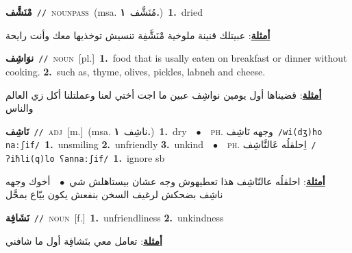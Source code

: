 \documentclass[10pt,a4paper,twoside]{article} %
\begin{document}
\begin{multicols}{2}
{\setlength\topsep{0pt}\textbf{\foreignlanguage{arabic}{مْنَشَّف}}\ {\color{gray}\texttt{//}\color{black}}\ \textsc{noun\textunderscore pass}\ \color{gray}(msa. \foreignlanguage{arabic}{مُنَشَّف}~\foreignlanguage{arabic}{\textbf{١.}})\color{black}\ \textbf{1.}~dried\  \begin{flushright}\color{gray}\foreignlanguage{arabic}{\textbf{\underline{\foreignlanguage{arabic}{أمثلة}}}: عبيتلك قنينة ملوخية مْنَشَّفِة تنسيش توخذيها معك وأنت رايحة}\end{flushright}\color{black}} \vspace{2mm}

{\setlength\topsep{0pt}\textbf{\foreignlanguage{arabic}{نوَاشِف}}\ {\color{gray}\texttt{//}\color{black}}\ \textsc{noun}\ [pl.]\ \textbf{1.}~food that is usally eaten on breakfast or dinner without cooking.  \textbf{2.}~such as, thyme, olives, pickles, labneh and cheese.\  \begin{flushright}\color{gray}\foreignlanguage{arabic}{\textbf{\underline{\foreignlanguage{arabic}{أمثلة}}}: قضيناها أول يومين نواشِف عبين ما اجت أختي لعنا وعملتلنا أكل زي العالم والناس}\end{flushright}\color{black}} \vspace{2mm}

{\setlength\topsep{0pt}\textbf{\foreignlanguage{arabic}{نَاشِف}}\ {\color{gray}\texttt{//}\color{black}}\ \textsc{adj}\ [m.]\ \color{gray}(msa. \foreignlanguage{arabic}{ناشِف}~\foreignlanguage{arabic}{\textbf{١.}})\color{black}\ \textbf{1.}~dry\ \ $\bullet$\ \ \textsc{ph.} \color{gray} \foreignlanguage{arabic}{وجهه نَاشِف}\color{black}\ {\color{gray}\texttt{/{\sffamily wi(dʒ)ho naːʃif}/}\color{black}}\ \textbf{1.}~unsmiling  \textbf{2.}~unfriendly  \textbf{3.}~unkind\ \ $\bullet$\ \ \textsc{ph.} \color{gray} \foreignlanguage{arabic}{اِحلقلُه عَالنَّاشِف}\color{black}\ {\color{gray}\texttt{/{\sffamily ʔiħli(q)lo ʕannaːʃif}/}\color{black}}\ \textbf{1.}~ignore sb\  \begin{flushright}\color{gray}\foreignlanguage{arabic}{\textbf{\underline{\foreignlanguage{arabic}{أمثلة}}}: احلقلُه عالنّاشِف هذا تعطيهوش وجه عشان بيستاهلش شي\ $\bullet$\ \  أخوك وجهه ناشِف بضحكش لرغيف السخن بنفعش يكون بيّاع بمحَّل}\end{flushright}\color{black}} \vspace{2mm}

{\setlength\topsep{0pt}\textbf{\foreignlanguage{arabic}{نَشَافِة}}\ {\color{gray}\texttt{//}\color{black}}\ \textsc{noun}\ [f.]\ \textbf{1.}~unfriendliness  \textbf{2.}~unkindness\  \begin{flushright}\color{gray}\foreignlanguage{arabic}{\textbf{\underline{\foreignlanguage{arabic}{أمثلة}}}: تعامل معي بنَشافِة أول ما شافني}\end{flushright}\color{black}} \vspace{2mm}


\end{multicols}
\end{document}
